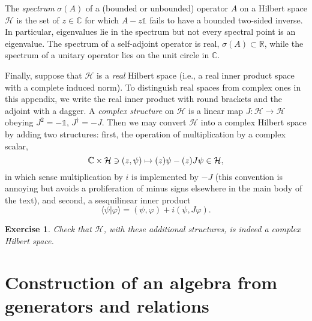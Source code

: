 \documentclass[12pt]{article}
\let\Re\relax
\let\Im\relax
\DeclareMathOperator{\Re}{Re}
\DeclareMathOperator{\Im}{Im}
\newcommand{\1}{\mathds{1}}                         %
\newcommand{\RR}{\mathbb{R}}           %
\newcommand{\CC}{\mathbb{C}}           %
\newcommand{\HH}{{\mathcal{H}}}
\newcommand{\II}{{\mathbb{1}}}
\newcommand{\ip}[2]{\langle #1|#2\rangle}
\newtheorem{exercise}[theorem]{Exercise}
\begin{document}
The \emph{spectrum} $\sigma(A)$ of a (bounded or unbounded) operator $A$ on a Hilbert space $\HH$ is the set of $z\in\CC$ for which $A-z\II$ fails to have a bounded two-sided inverse. 
In particular, eigenvalues lie in the spectrum but not every spectral point is an eigenvalue.
The spectrum of a self-adjoint operator is real, $\sigma(A)\subset\RR$, while the spectrum of a unitary operator lies on the unit circle in $\CC$.  

Finally, suppose that $\HH$ is a \emph{real} Hilbert space (i.e., a real inner product space with a complete induced norm). To distinguish real spaces from complex ones in this appendix, we write the real inner product with round brackets and the adjoint with a dagger. 
A \emph{complex structure} on $\HH$ is a linear map $J:\HH\to \HH$ obeying $J^2 = -\II$, $J^\dagger = -J$. Then we may convert $\HH$ into a complex Hilbert space by adding two structures: first, the operation of
multiplication by a complex scalar,
\[
\CC\times\HH\owns (z,\psi)\mapsto  (\Re z)\psi - (\Im z)J\psi \in\HH ,
\]
in which sense multiplication by $i$ is implemented by $-J$ (this convention is annoying but avoids a proliferation of minus signs elsewhere in the main body of the text), and second, 
a sesquilinear inner product
\[
\ip{\psi}{\varphi} = (\psi,\varphi) + i(\psi,J\varphi).
\]
\begin{exercise}
	Check that $\HH$, with these additional structures, is indeed a complex Hilbert space.
\end{exercise} 

\section{Construction of an algebra from generators and relations} \label{appx:presentation}
\end{document}
